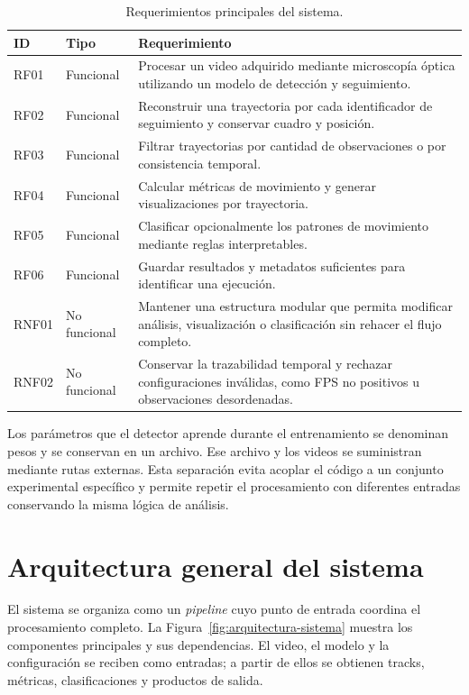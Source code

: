 \begin{table}[H]
  \centering
  \footnotesize
  \setlength{\tabcolsep}{5pt}
  \renewcommand{\arraystretch}{1.12}
  \caption{Requerimientos principales del sistema.}
  \label{tab:requerimientos-sistema}
  \begin{tabularx}{0.94\textwidth}{@{}p{}p{}X@{}}
    \toprule
    \textbf{ID} & \textbf{Tipo} & \textbf{Requerimiento} \\
    \midrule
    RF01 & Funcional & Procesar un video adquirido mediante microscopía óptica utilizando un modelo de detección y seguimiento. \\
    RF02 & Funcional & Reconstruir una trayectoria por cada identificador de seguimiento y conservar cuadro y posición. \\
    RF03 & Funcional & Filtrar trayectorias por cantidad de observaciones o por consistencia temporal. \\
    RF04 & Funcional & Calcular métricas de movimiento y generar visualizaciones por trayectoria. \\
    RF05 & Funcional & Clasificar opcionalmente los patrones de movimiento mediante reglas interpretables. \\
    RF06 & Funcional & Guardar resultados y metadatos suficientes para identificar una ejecución. \\
    RNF01 & No funcional & Mantener una estructura modular que permita modificar análisis, visualización o clasificación sin rehacer el flujo completo. \\
    RNF02 & No funcional & Conservar la trazabilidad temporal y rechazar configuraciones inválidas, como FPS no positivos u observaciones desordenadas. \\
    \bottomrule
  \end{tabularx}
\end{table}

Los parámetros que el detector aprende durante el entrenamiento se denominan pesos y se conservan en un archivo. Ese archivo y los videos se suministran mediante rutas externas. Esta separación evita acoplar el código a un conjunto experimental específico y permite repetir el procesamiento con diferentes entradas conservando la misma lógica de análisis.

\section{Arquitectura general del sistema}

El sistema se organiza como un \textit{pipeline} cuyo punto de entrada coordina el procesamiento completo. La Figura~\ref{fig:arquitectura-sistema} muestra los componentes principales y sus dependencias. El video, el modelo y la configuración se reciben como entradas; a partir de ellos se obtienen tracks, métricas, clasificaciones y productos de salida.

